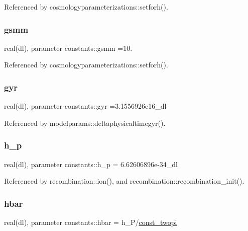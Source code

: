 Referenced by cosmologyparameterizations\+::setforh().

\mbox{\label{namespaceconstants_a1ab25da6741b45b6d7c0445aea4c15a9}} 
\subsubsection{\texorpdfstring{gsmm}{gsmm}}
{\footnotesize\ttfamily real(dl), parameter constants\+::gsmm =10.}



Referenced by cosmologyparameterizations\+::setforh().

\mbox{\label{namespaceconstants_a6b6035602c42bfffde2ac46fd0c0ae0c}} 
\subsubsection{\texorpdfstring{gyr}{gyr}}
{\footnotesize\ttfamily real(dl), parameter constants\+::gyr =3.\+1556926e16\+\_\+dl}



Referenced by modelparams\+::deltaphysicaltimegyr().

\mbox{\label{namespaceconstants_a3bfcfec5bb3ae395c9384035afa3ff0b}} 
\subsubsection{\texorpdfstring{h\+\_\+p}{h\_p}}
{\footnotesize\ttfamily real(dl), parameter constants\+::h\+\_\+p = 6.\+62606896e-\/34\+\_\+dl}



Referenced by recombination\+::ion(), and recombination\+::recombination\+\_\+init().

\mbox{\label{namespaceconstants_abd8e8d59da6e319d106a046b7ffd1500}} 
\subsubsection{\texorpdfstring{hbar}{hbar}}
{\footnotesize\ttfamily real(dl), parameter constants\+::hbar = h\+\_\+P/\mbox{\hyperlink{namespaceconstants_ad32ef1a62efe7e7467e8533103380ce5}{const\+\_\+twopi}}}

